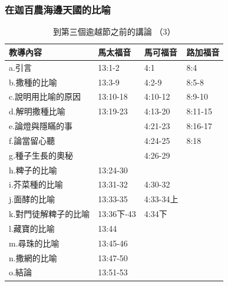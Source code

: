 \subsubsection{在迦百農海邊天國的比喻} 
\begin{table}[htbp]
  \centering

    \begin{tabular}{|p{11.645em}|p{5.355em}|l|l|}
    \toprule
     \multicolumn{1}{|p{9.645em}|}{教導內容} & 馬太福音 & 馬可福音 & 路加福音 \\
\midrule
    a.引言  & 13:1-2 & 4:1  & 8:4 \\
    \midrule
    b.撒種的比喻 & 13:3-9 & \multicolumn{1}{p{5.145em}|}{4:2-9} & \multicolumn{1}{p{5.285em}|}{8:5-8} \\
    \midrule
    c.說明用比喻的原因 & 13:10-18 & \multicolumn{1}{p{5.145em}|}{4:10-12} & \multicolumn{1}{p{5.285em}|}{8:9-10} \\
    \midrule
    d.解明撒種比喻 & 13:19-23 & \multicolumn{1}{p{5.145em}|}{4:13-20} & \multicolumn{1}{p{5.285em}|}{8:11-15} \\
    \midrule
    e.論燈與隱瞞的事 & \multicolumn{1}{r|}{} & \multicolumn{1}{p{5.145em}|}{4:21-23} & \multicolumn{1}{p{5.285em}|}{8:16-17} \\
    \midrule
    f.論當留心聽 & \multicolumn{1}{r|}{} & \multicolumn{1}{p{5.145em}|}{4:24-25} & 8:18 \\
    \midrule
    g.種子生長的奧秘 & \multicolumn{1}{r|}{} & \multicolumn{1}{p{5.145em}|}{4:26-29} &  \\
    \midrule
    h.粺子的比喻 & 13:24-30 &       &  \\
    \midrule
    i.芥菜種的比喻 & 13:31-32 & \multicolumn{1}{p{5.145em}|}{4:30-32} &  \\
    \midrule
    j.面酵的比喻 & 13:33-35 & \multicolumn{1}{p{5.145em}|}{4:33-34上} &  \\
    \midrule
    k.對門徒解粺子的比喻 & 13:36下-43 & \multicolumn{1}{p{5.145em}|}{4:34下} &  \\
    \midrule
    l.藏寶的比喻 & \multicolumn{1}{l|}{13:44} &       &  \\
    \midrule
    m.尋珠的比喻 & 13:45-46 &       &  \\
    \midrule
    n.撒網的比喻 & 13:47-50 &       &  \\
    \midrule
    o.結論  & 13:51-53 &       &  \\
    \bottomrule
    \end{tabular}%
     \caption{到第三個逾越節之前的講論 （3）}
  \label{tab:addlabel}%
\end{table}%

